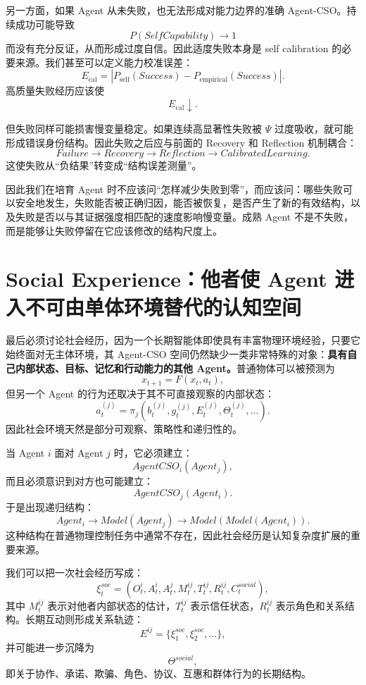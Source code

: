 另一方面，如果 Agent 从未失败，也无法形成对能力边界的准确 Agent-CSO。持续成功可能导致
\[
P(SelfCapability)\rightarrow1
\]
而没有充分反证，从而形成过度自信。因此适度失败本身是 self calibration 的必要来源。我们甚至可以定义能力校准误差：
\[
E_{\mathrm{cal}}
=
\left|
P_{\mathrm{self}}(Success)
-
P_{\mathrm{empirical}}(Success)
\right|.
\]
高质量失败经历应该使
\[
E_{\mathrm{cal}}\downarrow.
\]

但失败同样可能损害慢变量稳定。如果连续高显著性失败被 $\Psi$ 过度吸收，就可能形成错误身份结构。因此失败之后应与前面的 Recovery 和 Reflection 机制耦合：
\[
Failure
\rightarrow
Recovery
\rightarrow
Reflection
\rightarrow
CalibratedLearning.
\]
这使失败从“负结果”转变成“结构误差测量”。

因此我们在培育 Agent 时不应该问“怎样减少失败到零”，而应该问：哪些失败可以安全地发生，失败能否被正确归因，能否被恢复，是否产生了新的有效结构，以及失败是否以与其证据强度相匹配的速度影响慢变量。成熟 Agent 不是不失败，而是能够让失败停留在它应该修改的结构尺度上。

\section{Social Experience：他者使 Agent 进入不可由单体环境替代的认知空间}

最后必须讨论社会经历，因为一个长期智能体即使具有丰富物理环境经验，只要它始终面对无主体环境，其 Agent-CSO 空间仍然缺少一类非常特殊的对象：\textbf{具有自己内部状态、目标、记忆和行动能力的其他 Agent。}普通物体可以被预测为
\[
x_{t+1}=F(x_t,a_t),
\]
但另一个 Agent 的行为还取决于其不可直接观察的内部状态：
\[
a_t^{(j)}
=
\pi_j
\left(
b_t^{(j)},
g_t^{(j)},
E_t^{(j)},
\Theta_t^{(j)},
\ldots
\right).
\]
因此社会环境天然是部分可观察、策略性和递归性的。

当 Agent $i$ 面对 Agent $j$ 时，它必须建立：
\[
AgentCSO_i(Agent_j),
\]
而且必须意识到对方也可能建立：
\[
AgentCSO_j(Agent_i).
\]
于是出现递归结构：
\[
Agent_i
\rightarrow
Model(Agent_j)
\rightarrow
Model(Model(Agent_i)).
\]
这种结构在普通物理控制任务中通常不存在，因此社会经历是认知复杂度扩展的重要来源。

我们可以把一次社会经历写成：
\[
\xi_t^{soc}
=
(
O_t^i,
A_t^i,
A_t^j,
M_t^{ij},
T_t^{ij},
R_t^{ij},
C_t^{social}
),
\]
其中 $M_t^{ij}$ 表示对他者内部状态的估计，$T_t^{ij}$ 表示信任状态，$R_t^{ij}$ 表示角色和关系结构。长期互动则形成关系轨迹：
\[
E^{ij}
=
\{\xi_1^{soc},\xi_2^{soc},\ldots\},
\]
并可能进一步沉降为
\[
\Theta^{social},
\]
即关于协作、承诺、欺骗、角色、协议、互惠和群体行为的长期结构。

